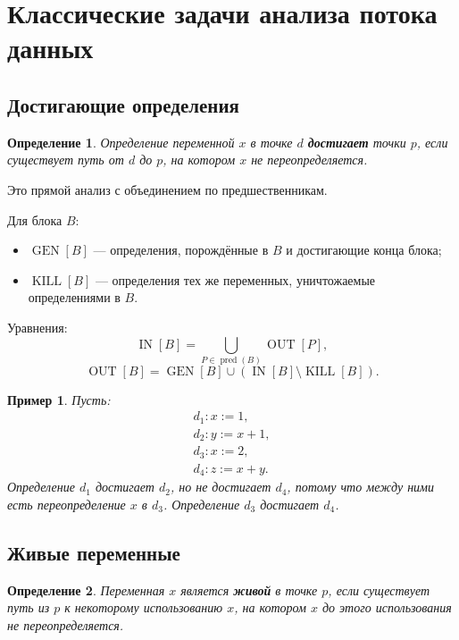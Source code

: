 \documentclass[12pt,a4paper]{article}
\newtheorem{definition}{Определение}
\newtheorem{example}{Пример}
\DeclareMathOperator{\IN}{IN}
\DeclareMathOperator{\OUT}{OUT}
\DeclareMathOperator{\GEN}{GEN}
\DeclareMathOperator{\KILL}{KILL}
\DeclareMathOperator{\pred}{pred}
\begin{document}
\section{Классические задачи анализа потока данных}

\subsection{Достигающие определения}

\begin{definition}
Определение переменной $x$ в точке $d$ \textbf{достигает} точки $p$, если существует путь от $d$ до $p$, на котором $x$ не переопределяется.
\end{definition}

Это прямой анализ с объединением по предшественникам.

Для блока $B$:
\begin{itemize}
    \item $\GEN[B]$ --- определения, порождённые в $B$ и достигающие конца блока;
    \item $\KILL[B]$ --- определения тех же переменных, уничтожаемые определениями в $B$.
\end{itemize}

Уравнения:
\[
\IN[B] = \bigcup_{P\in \pred(B)} \OUT[P],
\]
\[
\OUT[B] = \GEN[B] \cup (\IN[B] \setminus \KILL[B]).
\]

\begin{example}
Пусть:
\[
\begin{array}{l}
d_1: x := 1,\\
d_2: y := x + 1,\\
d_3: x := 2,\\
d_4: z := x + y.
\end{array}
\]
Определение $d_1$ достигает $d_2$, но не достигает $d_4$, потому что между ними есть переопределение $x$ в $d_3$. Определение $d_3$ достигает $d_4$.
\end{example}

\subsection{Живые переменные}

\begin{definition}
Переменная $x$ является \textbf{живой} в точке $p$, если существует путь из $p$ к некоторому использованию $x$, на котором $x$ до этого использования не переопределяется.
\end{definition}
\end{document}
